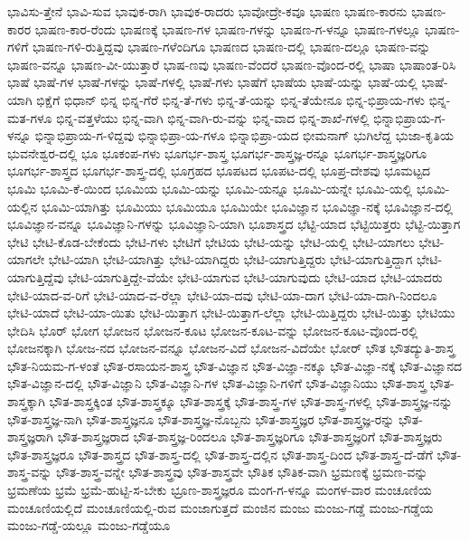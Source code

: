 {ಭಾವಿಸು-ತ್ತೇನೆ
ಭಾವಿ-ಸುವ
ಭಾವುಕ-ರಾಗಿ
ಭಾವುಕ-ರಾದರು
ಭಾವೋದ್ರೇ-ಕವೂ
ಭಾಷಣ
ಭಾಷಣ-ಕಾರನು
ಭಾಷಣ-ಕಾರರ
ಭಾಷಣ-ಕಾರ-ರೆಂದು
ಭಾಷಣಕ್ಕೆ
ಭಾಷಣ-ಗಳ
ಭಾಷಣ-ಗಳನ್ನು
ಭಾಷಣ-ಗ-ಳನ್ನೂ
ಭಾಷಣ-ಗಳಲ್ಲೂ
ಭಾಷಣ-ಗಳಿಗೆ
ಭಾಷಣ-ಗಳಿ-ರುತ್ತಿದ್ದವು
ಭಾಷಣ-ಗಳೆಂದಿಗೂ
ಭಾಷಣದ
ಭಾಷಣ-ದಲ್ಲಿ
ಭಾಷಣ-ದಲ್ಲೂ
ಭಾಷಣ-ವನ್ನು
ಭಾಷಣ-ವನ್ನೂ
ಭಾಷಣ-ವೀ-ಯುತ್ತಾರೆ
ಭಾಷ-ಣವು
ಭಾಷಣ-ವೆಂದರೆ
ಭಾಷಣ-ವೊಂದ-ರಲ್ಲಿ
ಭಾಷಾ
ಭಾಷಾಂತ-ರಿಸಿ
ಭಾಷೆ
ಭಾಷೆ-ಗಳ
ಭಾಷೆ-ಗಳನ್ನು
ಭಾಷೆ-ಗಳಲ್ಲಿ
ಭಾಷೆ-ಗಳು
ಭಾಷೆಗೆ
ಭಾಷೆಯ
ಭಾಷೆ-ಯನ್ನು
ಭಾಷೆ-ಯಲ್ಲಿ
ಭಾಷೆ-ಯಾಗಿ
ಭಿಕ್ಷೆಗೆ
ಭಿಧಾನ್
ಭಿನ್ನ
ಭಿನ್ನ-ಗೆರೆ
ಭಿನ್ನ-ತೆ-ಗಳು
ಭಿನ್ನ-ತೆ-ಯನ್ನು
ಭಿನ್ನ-ತೆಯೇನೂ
ಭಿನ್ನ-ಭಿಪ್ರಾಯ-ಗಳು
ಭಿನ್ನ-ಮತ-ಗಳೂ
ಭಿನ್ನ-ವತ್ತಳೆಯು
ಭಿನ್ನ-ವಾಗಿ
ಭಿನ್ನ-ವಾಗಿ-ರು-ವನ್ನು
ಭಿನ್ನ-ವಾದ
ಭಿನ್ನ-ಶಾಖೆ-ಗಳಲ್ಲಿ
ಭಿನ್ನಾಭಿಪ್ರಾಯ-ಗ-ಳನ್ನೂ
ಭಿನ್ನಾಭಿಪ್ರಾಯ-ಗ-ಳಿದ್ದವು
ಭಿನ್ನಾಭಿಪ್ರಾ-ಯ-ಗಳೂ
ಭಿನ್ನಾಭಿಪ್ರಾ-ಯದ
ಭೀಮನಾಗ್
ಭುಗಿಲೆದ್ದ
ಭುಜಾ-ಕೃತಿಯ
ಭುವನೇಶ್ವರ-ದಲ್ಲಿ
ಭೂ
ಭೂಕಂಪ-ಗಳು
ಭೂಗರ್ಭ-ಶಾಸ್ತ್ರ
ಭೂಗರ್ಭ-ಶಾಸ್ತ್ರಜ್ಞ-ರನ್ನೂ
ಭೂಗರ್ಭ-ಶಾಸ್ತ್ರಜ್ಞರಿಗೂ
ಭೂಗರ್ಭ-ಶಾಸ್ತ್ರದ
ಭೂಗರ್ಭ-ಶಾಸ್ತ್ರ-ದಲ್ಲಿ
ಭೂಗ್ರಹದ
ಭೂಪಟದ
ಭೂಪಟ-ದಲ್ಲಿ
ಭೂಪ್ರ-ದೇಶವು
ಭೂಮಟ್ಟದ
ಭೂಮಿ
ಭೂಮಿ-ಕೆ-ಯಿಂದ
ಭೂಮಿಯ
ಭೂಮಿ-ಯನ್ನು
ಭೂಮಿ-ಯನ್ನೂ
ಭೂಮಿ-ಯನ್ನೇ
ಭೂಮಿ-ಯಲ್ಲಿ
ಭೂಮಿ-ಯಲ್ಲಿನ
ಭೂಮಿ-ಯಾಗಿತ್ತು
ಭೂಮಿಯು
ಭೂಮಿಯೂ
ಭೂಮಿಯೇ
ಭೂವಿಜ್ಞಾನ
ಭೂವಿಜ್ಞಾ-ನಕ್ಕೆ
ಭೂವಿಜ್ಞಾನ-ದಲ್ಲಿ
ಭೂವಿಜ್ಞಾನ-ವನ್ನೂ
ಭೂವಿಜ್ಞಾನಿ-ಗಳನ್ನು
ಭೂವಿಜ್ಞಾನಿ-ಯಾಗಿ
ಭೂಶಾಸ್ತ್ರದ
ಭೆಟ್ಟಿ-ಯಾದ
ಭೆಟ್ಟಿಯಿತ್ತರು
ಭೆಟ್ಟಿ-ಯಿತ್ತಾಗ
ಭೇಟಿ
ಭೇಟಿ-ಕೊಡ-ಬೇಕೆಂದು
ಭೇಟಿ-ಗಳು
ಭೇಟಿಗೆ
ಭೇಟಿಯ
ಭೇಟಿ-ಯನ್ನು
ಭೇಟಿ-ಯಲ್ಲಿ
ಭೇಟಿ-ಯಾಗಲು
ಭೇಟಿ-ಯಾಗಲೇ
ಭೇಟಿ-ಯಾಗಿ
ಭೇಟಿ-ಯಾಗಿತ್ತು
ಭೇಟಿ-ಯಾಗಿದ್ದರು
ಭೇಟಿ-ಯಾಗುತ್ತಿದ್ದರು
ಭೇಟಿ-ಯಾಗುತ್ತಿದ್ದಾಗ
ಭೇಟಿ-ಯಾಗುತ್ತಿದ್ದೆವು
ಭೇಟಿ-ಯಾಗುತ್ತಿದ್ದೇ-ವೆಯೇ
ಭೇಟಿ-ಯಾಗುವ
ಭೇಟಿ-ಯಾಗುವುದು
ಭೇಟಿ-ಯಾದ
ಭೇಟಿ-ಯಾದರು
ಭೇಟಿ-ಯಾದ-ವ-ರಿಗೆ
ಭೇಟಿ-ಯಾದ-ವ-ರೆಲ್ಲಾ
ಭೇಟಿ-ಯಾ-ದವು
ಭೇಟಿ-ಯಾ-ದಾಗ
ಭೇಟಿ-ಯಾ-ದಾಗಿ-ನಿಂದಲೂ
ಭೇಟಿ-ಯಾದೆ
ಭೇಟಿ-ಯಾ-ಯಿತು
ಭೇಟಿ-ಯಿತ್ತಾಗ
ಭೇಟಿ-ಯಿತ್ತಾಗ-ಲೆಲ್ಲಾ
ಭೇಟಿ-ಯಿತ್ತಿದ್ದರು
ಭೇಟಿ-ಯಿತ್ತು
ಭೇಟಿಯು
ಭೇದಿಸಿ
ಭೊರ್
ಭೋಗ
ಭೋಜನ
ಭೋಜನ-ಕೂಟ
ಭೋಜನ-ಕೂಟ-ವನ್ನು
ಭೋಜನ-ಕೂಟ-ವೊಂದ-ರಲ್ಲಿ
ಭೋಜನಕ್ಕಾಗಿ
ಭೋಜ-ನದ
ಭೋಜನ-ವನ್ನೂ
ಭೋಜನ-ವಿದೆ
ಭೋಜನ-ವಿದೆಯೇ
ಭೋರ್
ಭೌತ
ಭೌತದ್ಯುತಿ-ಶಾಸ್ತ್ರ
ಭೌತ-ನಿಯಮ-ಗ-ಳಂತೆ
ಭೌತ-ರಸಾಯನ-ಶಾಸ್ತ್ರ
ಭೌತ-ವಿಜ್ಞಾನ
ಭೌತ-ವಿಜ್ಞಾ-ನಕ್ಕೂ
ಭೌತ-ವಿಜ್ಞಾ-ನಕ್ಕೆ
ಭೌತ-ವಿಜ್ಞಾನದ
ಭೌತ-ವಿಜ್ಞಾನ-ದಲ್ಲಿ
ಭೌತ-ವಿಜ್ಞಾನಿ
ಭೌತ-ವಿಜ್ಞಾನಿ-ಗಳ
ಭೌತ-ವಿಜ್ಞಾನಿ-ಗಳಿಗೆ
ಭೌತ-ವಿಜ್ಞಾನಿಯು
ಭೌತ-ಶಾಸ್ತ್ರ
ಭೌತ-ಶಾಸ್ತ್ರಕ್ಕಾಗಿ
ಭೌತ-ಶಾಸ್ತ್ರಕ್ಕಿಂತ
ಭೌತ-ಶಾಸ್ತ್ರಕ್ಕೂ
ಭೌತ-ಶಾಸ್ತ್ರಕ್ಕೆ
ಭೌತ-ಶಾಸ್ತ್ರ-ಗಳ
ಭೌತ-ಶಾಸ್ತ್ರ-ಗಳಲ್ಲಿ
ಭೌತ-ಶಾಸ್ತ್ರಜ್ಞ-ನನ್ನು
ಭೌತ-ಶಾಸ್ತ್ರಜ್ಞ-ನಾಗಿ
ಭೌತ-ಶಾಸ್ತ್ರಜ್ಞನೂ
ಭೌತ-ಶಾಸ್ತ್ರಜ್ಞ-ನೊಬ್ಬನು
ಭೌತ-ಶಾಸ್ತ್ರಜ್ಞರ
ಭೌತ-ಶಾಸ್ತ್ರಜ್ಞ-ರನ್ನು
ಭೌತ-ಶಾಸ್ತ್ರಜ್ಞರಾಗಿ
ಭೌತ-ಶಾಸ್ತ್ರಜ್ಞರಾದ
ಭೌತ-ಶಾಸ್ತ್ರಜ್ಞ-ರಿಂದಲೂ
ಭೌತ-ಶಾಸ್ತ್ರಜ್ಞರಿಗೂ
ಭೌತ-ಶಾಸ್ತ್ರಜ್ಞರಿಗೆ
ಭೌತ-ಶಾಸ್ತ್ರಜ್ಞರು
ಭೌತ-ಶಾಸ್ತ್ರಜ್ಞರೂ
ಭೌತ-ಶಾಸ್ತ್ರದ
ಭೌತ-ಶಾಸ್ತ್ರ-ದಲ್ಲಿ
ಭೌತ-ಶಾಸ್ತ್ರ-ದಲ್ಲಿನ
ಭೌತ-ಶಾಸ್ತ್ರ-ದಿಂದ
ಭೌತ-ಶಾಸ್ತ್ರ-ದೆ-ಡೆಗೆ
ಭೌತ-ಶಾಸ್ತ್ರ-ವನ್ನು
ಭೌತ-ಶಾಸ್ತ್ರ-ವನ್ನೇ
ಭೌತ-ಶಾಸ್ತ್ರವು
ಭೌತ-ಶಾಸ್ತ್ರವೇ
ಭೌತಿಕ
ಭೌತಿಕ-ವಾಗಿ
ಭ್ರಮಣಕ್ಕೆ
ಭ್ರಮಣ-ವನ್ನು
ಭ್ರಮಣೆಯ
ಭ್ರಮೆ
ಭ್ರಮೆ-ಹುಟ್ಟಿ-ಸ-ಬೇಕು
ಭ್ರೂಣ-ಶಾಸ್ತ್ರಜ್ಞರೂ
ಮಂಗ-ಗ-ಳನ್ನೂ
ಮಂಗಳ-ವಾರ
ಮಂಚೂಣಿಯ
ಮಂಚೂಣಿಯಲ್ಲಿದೆ
ಮಂಚೂಣಿಯಲ್ಲಿ-ರುವ
ಮಂಜಾಗುತ್ತದೆ
ಮಂಜಿನ
ಮಂಜು
ಮಂಜು-ಗಡ್ಡೆ
ಮಂಜು-ಗಡ್ಡೆಯ
ಮಂಜು-ಗಡ್ಡೆ-ಯಲ್ಲೂ
ಮಂಜು-ಗಡ್ಡೆಯೂ
}
